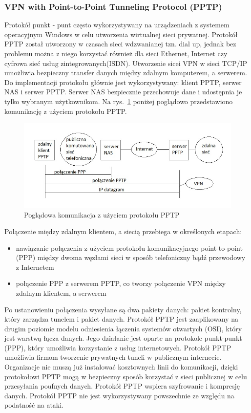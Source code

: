 \documentclass[12p]{article}
\begin{document}
\subsubsection{VPN with Point-to-Point Tunneling Protocol (PPTP)}
\quad Protokół punkt - punt często wykorzystywany na urządzeniach z systemem operacyjnym Windows w celu utworzenia wirtualnej sieci prywatnej. Protokół PPTP został utworzony w czasach sieci wdzwanianej tzn. dial up, jednak bez problemu można z niego korzystać również dla sieci Ethernet, Internet czy cyfrowa sieć usług zintegrowanych(ISDN). Utworzenie sicei VPN w sieci TCP/IP umożliwia bezpieczny transfer danych między zdalnym komputerem, a serwerem. Do implementacji protokołu głównie jest wykorzystywany: klient PPTP, serwer NAS i serwer PPTP. Serwer NAS bezpiecznie przechowuje dane i udostępnia je tylko wybranym użytkownikom. Na rys.~\ref{PPTP} poniżej poglądowo przedstawiono komunikację z użyciem protokołu PPTP. 
\begin{figure}[H]
\centering
\includegraphics[width=12cm]{komunikacja_PPTP.jpg}
\caption{Poglądowa komunikacja z użyciem protokołu PPTP}\label{PPTP}
\end{figure}

Połączenie między zdalnym klientem, a siecią przebiega w określonych etapach:
\begin{itemize}
\item nawiązanie połączenia z użyciem protokołu komunikacyjnego point-to-point (PPP) między dwoma węzłami sieci w sposób telefoniczny bądź przewodowy z Internetem
\item połączenie PPP z serwerem PPTP, co tworzy połączenie VPN między zdalnym klientem, a serwerem
\end{itemize}
Po ustanowieniu połączenia wysyłane są dwa pakiety danych: pakiet kontrolny, który zarządza tunelem i pakiet danych. Protokół PPTP jest zaaplikowany na drugim poziomie modelu odniesienia łączenia systemów otwartych (OSI), który jest warstwą łącza danych. Jego działanie jest oparte na protokole punkt-punkt (PPP), który umożliwia korzystanie z usług internetowych. Protokół PPTP umożliwia firmom tworzenie prywatnych tuneli w publicznym internecie. Organizacje nie muszą już instalować kosztownych linii do komunikacji, dzięki protokołowi PPTP mogą w bezpieczny sposób korzystać z sieci publicznej w celu przesyłania poufnych danych. Protokół PPTP wspiera szyfrowanie i kompresję danych. Protokół PPTP nie jest wykorzystywany powszechnie ze względu na podatność na ataki.~\cite{PPTP}
\end{document}
